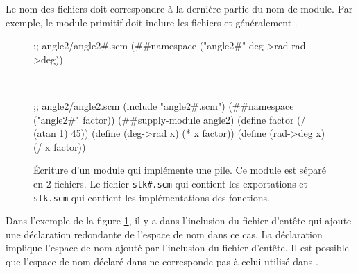 Le nom des fichiers doit correspondre à la dernière partie du nom de module.  Par
exemple, le module primitif  doit inclure les fichiers
 et généralement .\\
\begin{figure}[ht]
\begin{mplisting}{0.9}
;; angle2/angle2#.scm
(##namespace ("angle2#" deg->rad rad->deg))
\end{mplisting}\\[4ex]
\begin{mplisting}{0.9}
;; angle2/angle2.scm
(include "angle2#.scm")
(##namespace ("angle2#" factor))
(##supply-module angle2)
(define factor (/ (atan 1) 45))
(define (deg->rad x) (* x factor))
(define (rad->deg x) (/ x factor))
\end{mplisting}
  \caption{Écriture d'un module qui implémente une pile. Ce module est
           séparé en 2 fichiers. Le fichier \texttt{stk\#.scm} qui contient les
           exportations et \texttt{stk.scm} qui contient les implémentations des
           fonctions.}
  \label{fig:module->angle}
\end{figure}


%

Dans l'exemple de la figure \ref{fig:module->angle}, il y a dans
 l'inclusion du fichier d'entête
 qui ajoute une déclaration redondante de l'espace
de nom dans ce cas.  La déclaration 
implique l'espace de nom ajouté par l'inclusion du fichier d'entête. Il est
possible que l'espace de nom déclaré dans  ne
corresponde pas à celui utilisé dans .

